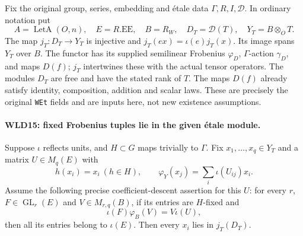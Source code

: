 \documentclass[11pt,a4paper]{article}
\numberwithin{equation}{section}
\theoremstyle{remark}\newtheorem{remark}[theorem]{Remark}
\begin{document}
Fix the original group, series, embedding and \'etale data
$\Gamma,R,I,\mathcal D$. In ordinary notation put
\[
 A=\operatorname{LetA}(O,n),\quad E=R.\mathrm{EE},\quad
 B=R_W,\quad D_T=\mathcal D(T),\quad Y_T=B\otimes_OT.
\]
The map $j_T:D_T\to Y_T$ is injective and
$j_T(ex)=\iota(e)j_T(x)$. Its image spans $Y_T$ over $B$.
The functor has its supplied semilinear Frobenius $\varphi_D$,
$\Gamma$-action $\gamma_D$, and maps $D(f)$; $j_T$ intertwines
these with the actual tensor operators. The modules $D_T$ are
free and have the stated rank of $T$. The maps $D(f)$ already
satisfy identity, composition, addition and scalar laws.
These are precisely the original \texttt{WEt} fields and are
inputs here, not new existence assumptions.

\paragraph{WLD15: fixed Frobenius tuples lie in the given \'etale module.}
\label{claim:WLD15}
Suppose $\iota$ reflects units, and $H\subset G$ maps trivially to
$\Gamma$. Fix $x_1,\ldots,x_q\in Y_T$ and a matrix $U\in M_q(E)$
with
\[
 h(x_i)=x_i\ (h\in H),\qquad
            \varphi_Y(x_j)=\sum_i\iota(U_{ij})x_i.          \tag{WLD.18}
\]
Assume the following precise coefficient-descent assertion for this
$U$: for every $r$, $F\in\operatorname{GL}_r(E)$ and
$V\in M_{r,q}(B)$, if its entries are $H$-fixed and
\[
                    \iota(F)\varphi_B(V)=V\iota(U),        \tag{WLD.19}
\]
then all its entries belong to $\iota(E)$. Then every $x_i$ lies
in $j_T(D_T)$.
\end{document}
